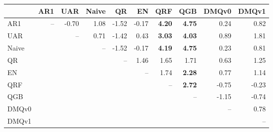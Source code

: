 \begin{tabular}{lrrrrrrrrr}
\toprule
 & AR1 & UAR & Naive & QR & EN & QRF & QGB & DMQv0 & DMQv1 \\
\midrule
AR1 & -- & -0.70 & 1.08 & -1.52 & -0.17 & \textbf{4.20} & \textbf{4.75} & 0.24 & 0.82 \\
UAR &  & -- & 0.71 & -1.42 & 0.43 & \textbf{3.03} & \textbf{4.03} & 0.89 & 1.81 \\
Naive &  &  & -- & -1.52 & -0.17 & \textbf{4.19} & \textbf{4.75} & 0.23 & 0.81 \\
QR &  &  &  & -- & 1.46 & 1.65 & 1.71 & 0.63 & 1.25 \\
EN &  &  &  &  & -- & 1.74 & \textbf{2.28} & 0.77 & 1.14 \\
QRF &  &  &  &  &  & -- & \textbf{2.72} & -0.75 & -0.23 \\
QGB &  &  &  &  &  &  & -- & -1.15 & -0.74 \\
DMQv0 &  &  &  &  &  &  &  & -- & 0.78 \\
DMQv1 &  &  &  &  &  &  &  &  & -- \\
\bottomrule
\end{tabular}
